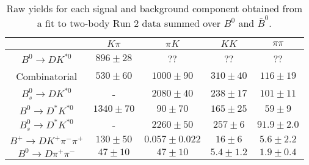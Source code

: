 \begin{table}
  \centering
  \begin{tabular}{ccccc}
      \toprule
       & $K\pi$ & $\pi K$ & $KK$ & $\pi\pi$ \\
      \midrule
      $B^0 \to DK^{*0}$ & $896 \pm 28$ & ?? & ?? & ?? \\
      Combinatorial & $530 \pm 60$ & $1000 \pm 90$ & $310 \pm 40$ & $116 \pm 19$ \\
      $B^0_s \to DK^{*0}$ & \-- & $2080 \pm 40$ & $238 \pm 17$ & $101 \pm 11$ \\
      $B^0 \to D^*K^{*0}$ & $1340 \pm 70$ & $90 \pm 70$ & $165 \pm 25$ & $59 \pm 9$ \\
      $B^0_s \to D^*K^{*0}$ & \-- & $2260 \pm 50$ & $257 \pm 6$ & $91.9 \pm 2.0$ \\
      $B^+ \to DK^+\pi^-\pi^+$ & $130 \pm 50$ & $0.057 \pm 0.022$ & $16 \pm 6$ & $5.6 \pm 2.2$ \\
      $B^0 \to D\pi^+\pi^-$ & $47 \pm 10$ & $47 \pm 10$ & $5.4 \pm 1.2$ & $1.9 \pm 0.4$ \\
      \bottomrule
      \end{tabular}
  \caption{Raw yields for each signal and background component obtained from a fit to two-body Run 2 data summed over $B^0$ and $\bar{B}^0$.}
\label{tab:yields_combined_2body_run2}
\end{table}
